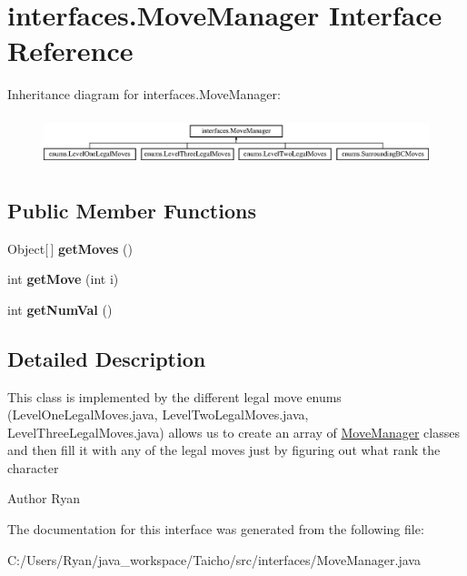 \hypertarget{interfaceinterfaces_1_1_move_manager}{\section{interfaces.\-Move\-Manager Interface Reference}
\label{interfaceinterfaces_1_1_move_manager}
}
Inheritance diagram for interfaces.\-Move\-Manager\-:\begin{figure}[H]
\begin{center}
\leavevmode
\includegraphics[height=1.450777cm]{interfaceinterfaces_1_1_move_manager}
\end{center}
\end{figure}
\subsection*{Public Member Functions}
\begin{DoxyCompactItemize}
\item 
\hypertarget{interfaceinterfaces_1_1_move_manager_a825bf2ae503abb8de12185a9ebae6e50}{Object\mbox{[}$\,$\mbox{]} {\bfseries get\-Moves} ()}\label{interfaceinterfaces_1_1_move_manager_a825bf2ae503abb8de12185a9ebae6e50}

\item 
\hypertarget{interfaceinterfaces_1_1_move_manager_ac0268c060ca8f38baf34dcca225b3556}{int {\bfseries get\-Move} (int i)}\label{interfaceinterfaces_1_1_move_manager_ac0268c060ca8f38baf34dcca225b3556}

\item 
\hypertarget{interfaceinterfaces_1_1_move_manager_ab862577e01722b6429b553b9db897021}{int {\bfseries get\-Num\-Val} ()}\label{interfaceinterfaces_1_1_move_manager_ab862577e01722b6429b553b9db897021}

\end{DoxyCompactItemize}


\subsection{Detailed Description}
This class is implemented by the different legal move enums (Level\-One\-Legal\-Moves.\-java, Level\-Two\-Legal\-Moves.\-java, Level\-Three\-Legal\-Moves.\-java) allows us to create an array of \hyperlink{interfaceinterfaces_1_1_move_manager}{Move\-Manager} classes and then fill it with any of the legal moves just by figuring out what rank the character \begin{DoxyAuthor}{Author}
Ryan 
\end{DoxyAuthor}


The documentation for this interface was generated from the following file\-:\begin{DoxyCompactItemize}
\item 
C\-:/\-Users/\-Ryan/java\-\_\-workspace/\-Taicho/src/interfaces/Move\-Manager.\-java\end{DoxyCompactItemize}
